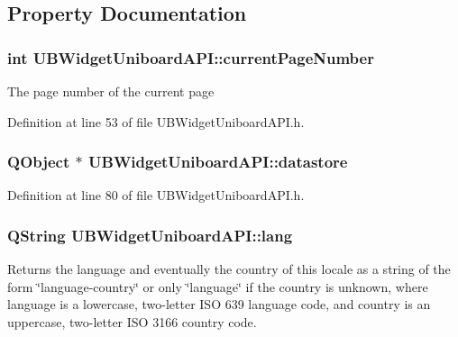 \subsection{Property Documentation}
\hypertarget{class_u_b_widget_uniboard_a_p_i_a43780354b20b4749b16e677c4f014f85}{
\subsubsection[{current\-Page\-Number}]{\setlength{\rightskip}{0pt plus 5cm}int U\-B\-Widget\-Uniboard\-A\-P\-I\-::current\-Page\-Number\hspace{0.3cm}{\ttfamily [read]}}}\label{d5/d2b/class_u_b_widget_uniboard_a_p_i_a43780354b20b4749b16e677c4f014f85}
The page number of the current page 

Definition at line 53 of file U\-B\-Widget\-Uniboard\-A\-P\-I.\-h.

\hypertarget{class_u_b_widget_uniboard_a_p_i_a9797b142d1083de75b88ec5e5d3368a4}{
\subsubsection[{datastore}]{\setlength{\rightskip}{0pt plus 5cm}Q\-Object $\ast$ U\-B\-Widget\-Uniboard\-A\-P\-I\-::datastore\hspace{0.3cm}{\ttfamily [read]}}}\label{d5/d2b/class_u_b_widget_uniboard_a_p_i_a9797b142d1083de75b88ec5e5d3368a4}


Definition at line 80 of file U\-B\-Widget\-Uniboard\-A\-P\-I.\-h.

\hypertarget{class_u_b_widget_uniboard_a_p_i_a8a34f433ea5b41c7fc8e3e3dc7b0b261}{
\subsubsection[{lang}]{\setlength{\rightskip}{0pt plus 5cm}Q\-String U\-B\-Widget\-Uniboard\-A\-P\-I\-::lang\hspace{0.3cm}{\ttfamily [read]}}}\label{d5/d2b/class_u_b_widget_uniboard_a_p_i_a8a34f433ea5b41c7fc8e3e3dc7b0b261}
Returns the language and eventually the country of this locale as a string of the form \char`\"{}language-\/country\char`\"{} or only \char`\"{}language\char`\"{} if the country is unknown, where language is a lowercase, two-\/letter I\-S\-O 639 language code, and country is an uppercase, two-\/letter I\-S\-O 3166 country code.

